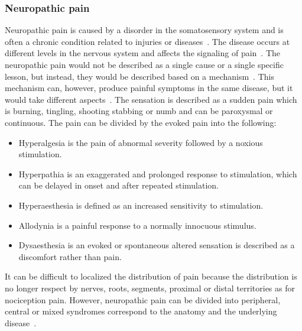 \subsubsection{Neuropathic pain}
Neuropathic pain is caused by a disorder in the somatosensory system and is often a chronic condition related to injuries or diseases~\cite{Mindruta2013}. The disease occurs at different levels in the nervous system and affects the signaling of pain~\cite{Mindruta2013}. The neuropathic pain would not be described as a single cause or a single specific lesson, but instead, they would be described based on a mechanism~\cite{Mindruta2013}. This mechanism can, however, produce painful symptoms in the same disease, but it would take different aspects~\cite{Mindruta2013}.
The sensation is described as a sudden pain which is burning, tingling, shooting stabbing or numb and can be paroxysmal or continuous. The pain can be divided by the evoked pain into the following:
\begin{itemize}
	\item Hyperalgesia is the pain of abnormal severity followed by a noxious stimulation.
	\item Hyperpathia is an exaggerated and prolonged response to stimulation, which can be delayed in onset and after repeated stimulation. 
	\item Hyperaesthesia is defined as an increased sensitivity to stimulation. 
	\item Allodynia is a painful response to a normally innocuous stimulus. 
	\item Dysaesthesia is an evoked or spontaneous altered sensation is described as a discomfort rather than pain. 
\end{itemize}

It can be difficult to localized the distribution of pain because the distribution is no longer respect by nerves, roots, segments, proximal or distal territories as for nociception pain. However, neuropathic pain can be divided into peripheral, central or mixed syndromes correspond to the anatomy and the underlying disease~\cite{Mindruta2013}. 


